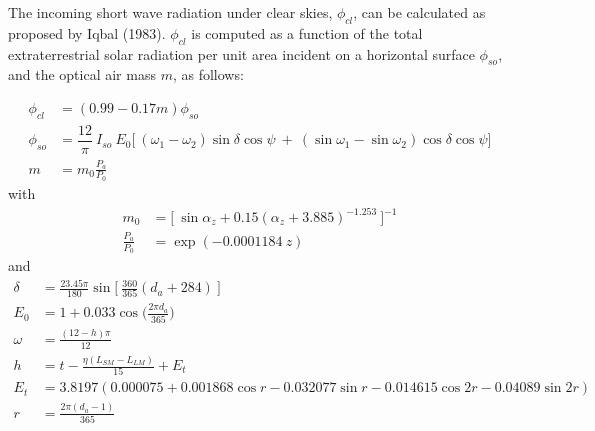 The incoming short wave radiation under clear skies, $\phi_{cl}$, can be calculated as proposed by Iqbal (1983).
$\phi_{cl}$ is computed as a function of the total extraterrestrial solar radiation per unit area incident on a horizontal surface $\phi_{so}$,
and the optical air mass $m$, as follows:

\begin{equation} \label{eq:phicl}
  \begin{aligned}
  \phi_{cl} &= ( 0.99-0.17m ) \phi_{so} \\
  \phi_{so} &= \dfrac{12}{\pi}\ I_{so}\ E_0\Big[\ (\omega_1-\omega_2)\sin\delta\cos\psi\ +\ (\sin\omega_1-\sin\omega_2)\cos\delta\cos\psi \Big] \\
   m &= m_0\frac{P_a}{P_0}
  \end{aligned}
\end{equation}
with
\begin{equation} \label{eq:phiso}
  \begin{aligned}
   m_0 &= \Big[\ \sin\alpha_z+0.15(\alpha_z+3.885)^{-1.253}\ \Big]^{-1} \\
  \frac{P_a}{P_0} &= \exp ( -0.0001184\ z )
  \end{aligned}
\end{equation}
and
\begin{equation} \label{eq:phiso}
  \begin{aligned}
  \delta &= \frac{23.45\pi}{180}\sin\Big[\ \frac{360}{365}(d_a+284)\ \Big] \\
  E_0 &= 1+0.033\cos\Big(\frac{2\pi d_a}{365}\Big)\\
    \omega &= \frac{(12-h)\pi}{12}\\
    h &= t - \frac{\eta(L_{SM}-L_{LM})}{15}+E_t\\
    E_t &= 3.8197(0.000075 + 0.001868 \cos{r} - 0.032077 \sin{r} -0.014615 \cos{2r} - 0.04089 \sin{2r})\\
    r &= \frac{2\pi(d_a-1)}{365}
  \end{aligned}
\end{equation}


